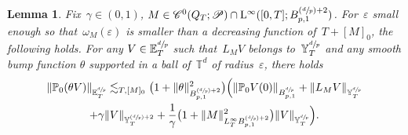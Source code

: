 \documentclass[10pt]{amsart}
\newcommand{\Psfrac}[2]{(\sfrac{#1}{#2})}
\newtheorem{lem}[prop]{Lemma}
\theoremstyle{definition}
\newcommand\T{\mathbb{T}}
\renewcommand\L{\mathrm{L}}
\let\ep\varepsilon
\begin{document}
\begin{lem}\label{lem:locbesov}
Fix~$\gamma \in (0,1)$, $M\in\mathscr{C}^{0}(Q_T;\mathscr{P})\cap \L^\infty ([0,T];B^{\Psfrac dp+2}_{p,1}) $.
For~$\ep$ small enough so that~$\omega_M(\ep)$ is smaller than a decreasing function of~$T+[M]_0 $, the following holds. For any $V\in {\mathbb E}^{\sfrac dp}_T$ such that~$L_{M }V $ belongs to~$ {\mathbb Y}^{\sfrac dp}_T$ and any smooth bump function $\theta$ supported in a ball of~$\T^d$ of radius~$\ep$, there holds\vspace*{-3pt}
\begin{multline*}
\|\mathbb{P}_0(\theta V)\|_{{\mathbb E}^{\sfrac dp}_T} \lesssim_{T,[M]_0} \bigl(1+ \|\theta\|^2_{B^{\Psfrac dp+2}_{p,1}} \bigr)\Bigl(\|\mathbb{P}_0 V (0)\|_{B^{\sfrac dp}_{p,1}} + \| L_{M }V\|_{{\mathbb Y}^{\sfrac dp}_T} \\+ \gamma \|V\|_{{{\mathbb Y}^{\Psfrac dp +2}_T }} +\frac 1 \gamma\bigl(1+ \|M\|^2_{{L^\infty_T B^{\Psfrac dp+2}_{p,1} }} \bigr) \|V\|_{{{\mathbb Y}^{\sfrac dp}_T }} \Bigr).
\end{multline*}
\end{lem}
\end{document}

